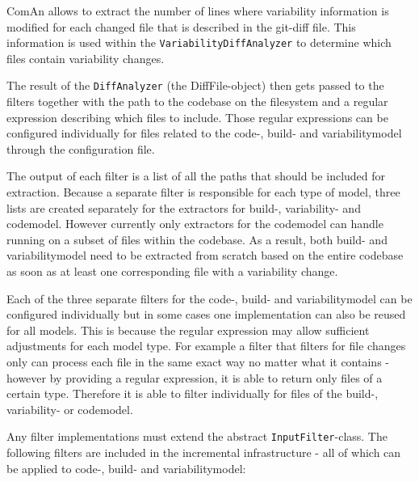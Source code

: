 \documentclass[a4paper]{article}
\begin{document}
ComAn allows to extract the number of lines where variability information is modified for each changed file that is described in the git-diff file. This information is used within the \texttt{VariabilityDiffAnalyzer} to determine which files contain variability changes.

The result of the \texttt{DiffAnalyzer} (the DiffFile-object) then gets passed to the filters together with the path to the codebase on the filesystem and a regular expression describing which files to include. Those regular expressions can be configured individually for files related to the code-, build- and variabilitymodel through the configuration file. 

The output of each filter is a list of all the paths that should be included for extraction. Because a separate filter is responsible for each type of model, three lists are created separately for the extractors for build-, variability- and codemodel.
However currently only extractors for the codemodel can handle running on a subset of files within the codebase. As a result, both build- and variabilitymodel need to be extracted from scratch based on the entire codebase as soon as at least one corresponding file with a variability change.

Each of the three separate filters for the code-, build- and variabilitymodel can be configured individually but in some cases one implementation can also be reused for all models. This is because the regular expression may allow sufficient adjustments for each model type. For example a filter that filters for file changes only can process each file in the same exact way no matter what it contains - however by providing a regular expression, it is able to return only files of a certain type. Therefore it is able to filter individually for files of the build-, variability- or codemodel.

 Any filter implementations must extend the abstract \texttt{InputFilter}-class. The following filters are included in the incremental infrastructure - all of which can be applied to code-, build- and variabilitymodel:
\end{document}
